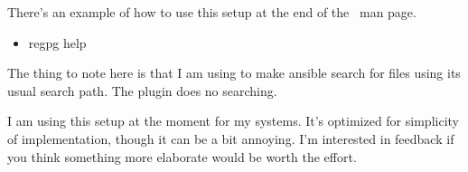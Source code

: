 {  There's an example of how to use this setup at the end of the
  \regpg\ man page.

  \begin{itemize}
  \item regpg help
  \end{itemize}

  The thing to note here is that I am using
   to make ansible search for files using
  its usual search path. The  plugin does no
  searching.

  I am using this setup at the moment for my systems. It's optimized
  for simplicity of implementation, though it can be a bit annoying.
  I'm interested in feedback if you think something more elaborate
  would be worth the effort.

}



